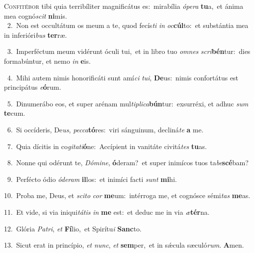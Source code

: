 \lettrine{\initial\textcolor{\initialcolor}{C}}{onfitébor} tibi quia terribíliter magnificátus es:~\dagger mirabília \textit{ó}\-\textit{pe}\textit{ra} \textbf{tu}\-a,~\star et ánima mea cognó\textit{scit} \textbf{ni}\-mis.\\
{\numbfont\textcolor{\numbcolor}{~2.}}~Non est occultátum os meum a te, quod fecís\textit{ti} \textit{in} \textit{oc}\-\textbf{cúl}to:~\star et substántia mea in inferióri\textit{bus} \textbf{ter}\-ræ.\par
{\numbfont\textcolor{\numbcolor}{~3.}}~Imperféctum meum vidérunt óculi tui,~\dagger et in libro tuo \textit{om}\-\textit{nes} \textit{scri}\-\textbf{bén}tur:~\star dies formabúntur, et nemo \textit{in} \textbf{e}\-is.\par
{\numbfont\textcolor{\numbcolor}{~4.}}~Mihi autem nimis honorificáti sunt amí\textit{ci} \textit{tu}\-\textit{i}, \textbf{De}\-us:~\star nimis confortátus est principátus \textit{e}\-\textbf{ó}rum.\par
{\numbfont\textcolor{\numbcolor}{~5.}}~Dinumerábo eos, et super arénam mul\-\textit{ti}\-\textit{pli}\textit{ca}\textbf{bún}tur:~\star exsurréxi, et adhuc \textit{sum} \textbf{te}\-cum.\par
{\numbfont\textcolor{\numbcolor}{~6.}}~Si occíderis, De\-\textit{us}\-, \textit{pec}\-\textit{ca}\textbf{tó}res:~\star viri sánguinum, decliná\textit{te} \textbf{a} me.\par
{\numbfont\textcolor{\numbcolor}{~7.}}~Quia dícitis in co\-\textit{gi}\-\textit{ta}\textit{ti}\textbf{ó}ne:~\star Accípient in vanitáte civitá\textit{tes} \textbf{tu}\-as.\par
{\numbfont\textcolor{\numbcolor}{~8.}}~Nonne qui odérunt te, \textit{Dó}\-\textit{mi}\textit{ne}, \textbf{ó}\-deram?~\star et super inimícos tuos ta\-\textit{be}\-\textbf{scé}bam?\par
{\numbfont\textcolor{\numbcolor}{~9.}}~Perfécto ódio \textit{ó}\-\textit{de}\textit{ram} \textbf{il}\-los:~\star et inimíci facti \textit{sunt} \textbf{mi}\-hi.\par
{\numbfont\textcolor{\numbcolor}{10.}}~Proba me, Deus, et \textit{sci}\-\textit{to} \textit{cor} \textbf{me}\-um:~\star intérroga me, et cognósce sémi\textit{tas} \textbf{me}\-as.\par
{\numbfont\textcolor{\numbcolor}{11.}}~Et vide, si via iniqui\-\textit{tá}\-\textit{tis} \textit{in} \textbf{me} est:~\star et deduc me in via \textit{æ}\-\textbf{tér}na.\par
{\numbfont\textcolor{\numbcolor}{12.}}~Glória \textit{Pa}\-\textit{tri}, \textit{et} \textbf{Fí}\-lio,~\star et Spirítu\textit{i} \textbf{Sanc}\-to.\par
{\numbfont\textcolor{\numbcolor}{13.}}~Sicut erat in princípio, \textit{et} \textit{nunc}\-, \textit{et} \textbf{sem}\-per,~\star et in sǽcula sæculó\-\textit{rum}\-. \textbf{A}\-men.\par
